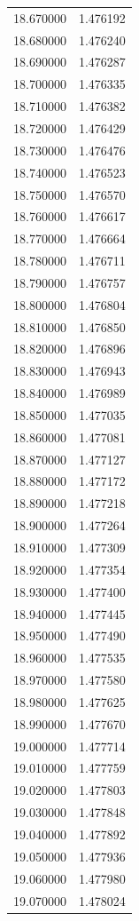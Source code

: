 \begin{tabular}{rr}
18.670000 & 1.476192 \\
18.680000 & 1.476240 \\
18.690000 & 1.476287 \\
18.700000 & 1.476335 \\
18.710000 & 1.476382 \\
18.720000 & 1.476429 \\
18.730000 & 1.476476 \\
18.740000 & 1.476523 \\
18.750000 & 1.476570 \\
18.760000 & 1.476617 \\
18.770000 & 1.476664 \\
18.780000 & 1.476711 \\
18.790000 & 1.476757 \\
18.800000 & 1.476804 \\
18.810000 & 1.476850 \\
18.820000 & 1.476896 \\
18.830000 & 1.476943 \\
18.840000 & 1.476989 \\
18.850000 & 1.477035 \\
18.860000 & 1.477081 \\
18.870000 & 1.477127 \\
18.880000 & 1.477172 \\
18.890000 & 1.477218 \\
18.900000 & 1.477264 \\
18.910000 & 1.477309 \\
18.920000 & 1.477354 \\
18.930000 & 1.477400 \\
18.940000 & 1.477445 \\
18.950000 & 1.477490 \\
18.960000 & 1.477535 \\
18.970000 & 1.477580 \\
18.980000 & 1.477625 \\
18.990000 & 1.477670 \\
19.000000 & 1.477714 \\
19.010000 & 1.477759 \\
19.020000 & 1.477803 \\
19.030000 & 1.477848 \\
19.040000 & 1.477892 \\
19.050000 & 1.477936 \\
19.060000 & 1.477980 \\
19.070000 & 1.478024 \\

\end{tabular}
